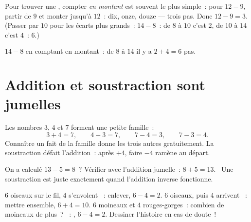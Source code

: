 \begin{method}\label{met:g1:subtraction:countup}
Pour trouver une , compter \emph{en montant} est souvent
le plus simple~: pour $12 - 9$, partir de $9$ et monter jusqu'à
$12$~: \guillemotleft{} dix, onze, douze \guillemotright{} --- trois
pas. Donc $12 - 9 = 3$. (Passer par $10$ pour les écarts plus
grands~: $14 - 8$~: de $8$ à $10$ c'est $2$, de $10$ à $14$ c'est
$4$~:  $6$.)
\end{method}

\begin{omfigure}

{\small $14 - 8$ en comptant en montant~: de $8$ à $14$ il y a
$2 + 4 = 6$ pas.}
\end{omfigure}

\section{Addition et soustraction sont jumelles}

\begin{example}\label{ex:g1:subtraction:family}
Les nombres $3$, $4$ et $7$ forment une petite famille~:
\[
3 + 4 = 7, \qquad
4 + 3 = 7, \qquad
7 - 4 = 3, \qquad
7 - 3 = 4 .
\]
Connaître un fait de la famille donne les trois autres
gratuitement. La soustraction défait l'addition~: après $+4$,
faire $-4$ ramène au départ.
\end{example}

\begin{example}[Vérifier]\label{ex:g1:subtraction:check}
On a calculé $13 - 5 = 8$~? Vérifier avec l'addition jumelle~:
$8 + 5 = 13$. \checkmark\ Une soustraction est juste exactement quand
l'addition inverse fonctionne.
\end{example}

\begin{example}\label{ex:g1:subtraction:choose}
\guillemotleft{} $6$ oiseaux sur le fil, $4$ s'envolent
\guillemotright{}~: enlever, $6 - 4 = 2$.
\guillemotleft{} $6$ oiseaux, puis $4$ arrivent \guillemotright{}~:
mettre ensemble, $6 + 4 = 10$.
\guillemotleft{} $6$ moineaux et $4$ rouges-gorges~: combien de
moineaux de plus~? \guillemotright{}~: , $6 - 4 = 2$.
Dessiner l'histoire en cas de doute~!
\end{example}

